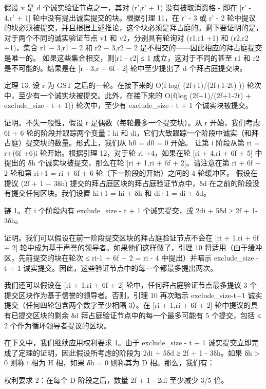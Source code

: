 假设 v 是 d 个诚实验证节点之一，其对 (r',r' + 1) 没有被取消资格 - 即在 [r' - 4,r' + 1] 轮中没有提出诚实提交的块。根据引理 11，在 r' - 3 或 r' - 2 轮中提议的块必须被提交，并且根据上述推论，这个块必须是拜占庭的。剩下要证明的是，对于两个不同的诚实验证节点 v1 和 v2，分别具有轮询对 (r1,r1 +1) 和 (r2,r2 +1)，集合 {r1 − 3,r1 − 2} 和​​ {r2 − 3,r2 − 2} 是不相交的——因此相应的拜占庭提交是唯一的。 如果这些集合相交，则|r1 - r2| ≤ 1 成立，这对于不同的甚至 r1 和 r2 是不可能的。结果是在 [r - 3,r + 6f - 2] 轮中至少提出了 d 个拜占庭提交块。

定理 13. 设 r 为 GST 之后的一轮。在接下来的 O(f log( (2f+1)/(2f+1-2t) )) 轮次中，至少有一个诚实块被提交。此外，在接下来的 O(f(log (2f+1)/(2f+1-2t) + exclude\_size - t + 1)) 轮次中，至少有 exclude\_size - t + 1 个诚实块被提交。

证明。不失一般性，假设 r 是偶数（每轮最多一个提交块）。从 r 开始，我们考虑 6f + 6 轮的阶段并跟踪两个变量：hi 和 di，它们大致跟踪一个阶段中诚实（和拜占庭）提交块的数量。形式上，我们从 h0 = d0 = 0 开始。
让第 i 阶段从第 ri = r+(6f +6)i 轮开始。根据引理 12，对于轮 ri +4，如果在轮 [ri + 4,ri + 6f + 5] 中提出的 δh 个诚实块被提交，那么在轮 [ri + 1,ri + 6f + 2]。请注意在第 ri + 6f + 2 轮和第 ri+1 = ri + 6f + 6 轮（下一阶段的开始）之间的 4 轮缓冲区。
假设在提议 (2f + 1 − 3δh) 提交的拜占庭区块的拜占庭验证节点中，δd 在之前的阶段没有提交任何区块。我们设置 hi+1 = hi + δh 和 di+1 = di + δd。

链 1。在 i 个阶段内有 exclude\_size - t + 1 个诚实提交，或 2di + 5δd ≥ 2f + 1- 3δh。

证明。我们可以假设在前一阶段提交区块的拜占庭验证节点不会在 [ri + 1,ri + 6f + 2] 轮中成为基于声誉的领导者。如果他们这样做了，引理 10 将适用（由于缓冲区，先前提交的块在轮次 ≤ ri-1 + 6f + 2 = ri - 4 中提出）并暗示 exclude\_size - t + 1 诚实提交。因此，这些验证节点中的每一个都最多提出两次。

我们还可以假设在 [ri + 1,ri + 6f + 2] 轮中，任何拜占庭验证节点最多提议 3 个提交区块作为基于信誉的领导者。否则，引理 10 再次暗示 exclude\_size-t+1 诚实提交（任何四轮包含两个数字至少相隔 3）。在 [ri + 1,ri + 6f + 2] 轮中提议的具有已提交区块的剩余 δd 拜占庭验证节点中的每一个最多可能有 5 个提交，包括 ≤ 2 个作为循环领导者提议的区块。

在下文中，我们继续应用权利要求 1。由于 exclude\_size - t + 1 诚实提交立即完成了定理的证明，因此假设所考虑的阶段为 2di + 5δd ≥ 2f + 1 - 3δh。如果 δh > 0 则称 i 相为 H 相，如果 δh = 0 则称其为 D 相。那么，我们有：

权利要求 2：在每个 D 阶段之后，数量 2f + 1 - 2di 至少减少 3/5 倍。

